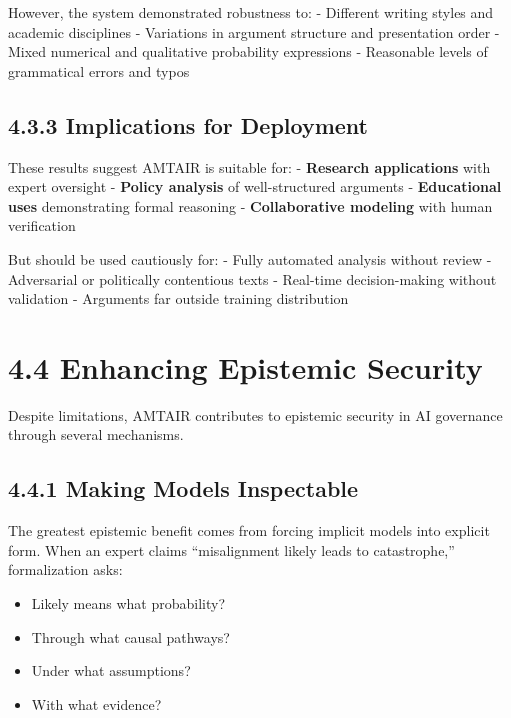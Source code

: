 \documentclass[
  11pt,
  letterpaper,
]{book}
\providecommand{\tightlist}{%
  \setlength{\itemsep}{0pt}\setlength{\parskip}{0pt}}
\begin{document}
However, the system demonstrated robustness to: - Different writing
styles and academic disciplines - Variations in argument structure and
presentation order - Mixed numerical and qualitative probability
expressions - Reasonable levels of grammatical errors and typos

\subsection*{4.3.3 Implications for
Deployment}\label{sec-deployment-implications}

These results suggest AMTAIR is suitable for: - \textbf{Research
applications} with expert oversight - \textbf{Policy analysis} of
well-structured arguments - \textbf{Educational uses} demonstrating
formal reasoning - \textbf{Collaborative modeling} with human
verification

But should be used cautiously for: - Fully automated analysis without
review - Adversarial or politically contentious texts - Real-time
decision-making without validation - Arguments far outside training
distribution

\section*{4.4 Enhancing Epistemic
Security}\label{sec-epistemic-security}


Despite limitations, AMTAIR contributes to epistemic security in AI
governance through several mechanisms.

\subsection*{4.4.1 Making Models
Inspectable}\label{sec-inspectable-models}

The greatest epistemic benefit comes from forcing implicit models into
explicit form. When an expert claims ``misalignment likely leads to
catastrophe,'' formalization asks:

\begin{itemize}
\tightlist
\item
  Likely means what probability?
\item
  Through what causal pathways?
\item
  Under what assumptions?
\item
  With what evidence?
\end{itemize}
\end{document}
